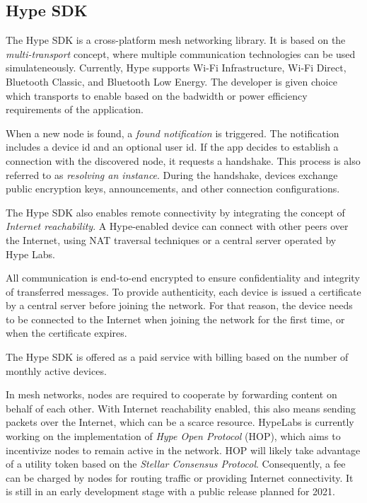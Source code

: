 \documentclass[conference,compsoc]{IEEEtran}
\begin{document}
\subsection{Hype SDK}
The Hype SDK \cite{hype} is a cross-platform mesh networking library. It is based on the \textit{multi-transport} concept, where multiple communication technologies can be used simulateneously. Currently, Hype supports Wi-Fi Infrastructure, Wi-Fi Direct, Bluetooth Classic, and Bluetooth Low Energy. The developer is given choice which transports to enable based on the badwidth or power efficiency requirements of the application.

When a new node is found, a \textit{found notification} is triggered. The notification includes a device id and an optional user id. If the app decides to establish a connection with the discovered node, it requests a handshake. This process is also referred to as \textit{resolving an instance}. During the handshake, devices exchange public encryption keys, announcements, and other connection configurations.

The Hype SDK also enables remote connectivity by integrating the concept of \textit{Internet reachability}. A Hype-enabled device can connect with other peers over the Internet, using NAT traversal techniques or a central server operated by Hype Labs.

All communication is end-to-end encrypted to ensure confidentiality and integrity of transferred messages. To provide authenticity, each device is issued a certificate by a central server before joining the network. For that reason, the device needs to be connected to the Internet when joining the network for the first time, or when the certificate expires.

The Hype SDK is offered as a paid service with billing based on the number of monthly active devices.

In mesh networks, nodes are required to cooperate by forwarding content on behalf of each other. With Internet reachability enabled, this also means sending packets over the Internet, which can be a scarce resource. HypeLabs is currently working on the implementation of \textit{Hype Open Protocol} (HOP), which aims to incentivize nodes to remain active in the network. HOP will likely take advantage of a utility token based on the \textit{Stellar Consensus Protocol}. Consequently, a fee can be charged by nodes for routing traffic or providing Internet connectivity. It is still in an early development stage with a public release planned for 2021. \cite{hop}
\end{document}
